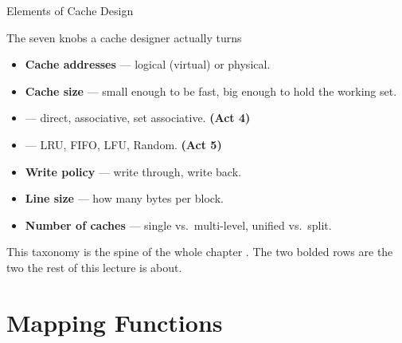 \documentclass[aspectratio=169]{beamer}
\begin{document}
\begin{frame}{Elements of Cache Design}
  \begin{block}{The seven knobs a cache designer actually turns}
    \begin{itemize}
      \item \textbf{Cache addresses} --- logical (virtual) or physical.
      \item \textbf{Cache size} --- small enough to be fast, big enough to hold
        the working set.
      \item {} --- direct, associative, set associative.
        \textbf{(Act 4)}
      \item {} --- LRU, FIFO, LFU, Random.
        \textbf{(Act 5)}
      \item \textbf{Write policy} --- write through, write back.
      \item \textbf{Line size} --- how many bytes per block.
      \item \textbf{Number of caches} --- single vs.\ multi-level, unified
        vs.\ split.
    \end{itemize}
  \end{block}
  This taxonomy is the spine of the whole chapter
  \cite[Table~5.1, PDF p.~184]{Stallings2015_computer_organization}. The two
  bolded rows are the two the rest of this lecture is about.
\end{frame}


\section{Mapping Functions}
\end{document}
